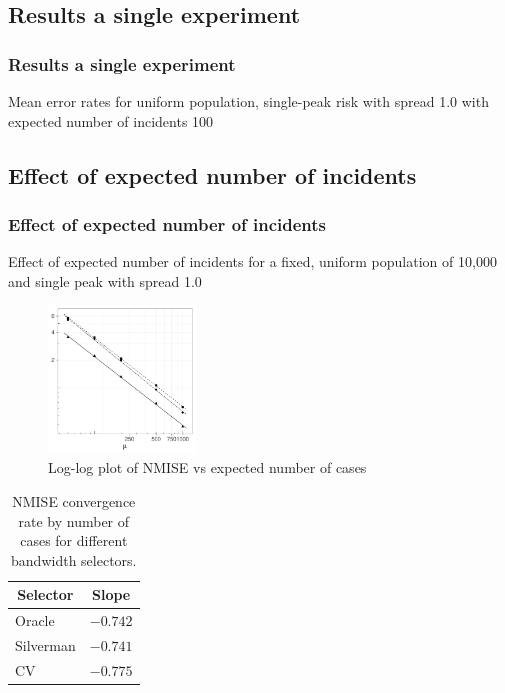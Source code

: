 \documentclass[notheorems]{beamer}
\theoremstyle{definition}
\theoremstyle{example}
\begin{document}
\subsection{Results a single experiment}
\begin{frame}\frametitle{Results a single experiment}
    \begin{table}
        \centering
        \footnotesize
        
        \caption
            {Mean error rates for uniform population, single-peak risk with spread 1.0 with expected number of incidents 100}
    \end{table}
\end{frame}


\subsection{Effect of expected number of incidents}
\begin{frame}\frametitle{Effect of expected number of incidents}
    \scriptsize
    Effect of expected number of incidents for a fixed, uniform population of 10,000 and single peak with spread 1.0
    \begin{figure}
        \caption{\tiny Log-log plot of NMISE vs expected number of cases}
        \includegraphics[width=0.35\textwidth]{results/by_num_cases/NMISE-vs-cases-log-log}
    \end{figure}
    \begin{table}[htbp]
        \footnotesize
        \begin{center}
            \begin{tabular}{lr}
                \toprule
                \multicolumn{1}{c}{Selector}&\multicolumn{1}{c}{Slope}\tabularnewline
                \midrule
                Oracle&$-0.742$\tabularnewline
                Silverman&$-0.741$\tabularnewline
                CV&$-0.775$\tabularnewline
                \bottomrule
            \end{tabular}
        \caption{\tiny NMISE convergence rate by number of cases for different bandwidth selectors.}
        \end{center}
    \end{table}
\end{frame}
\end{document}
